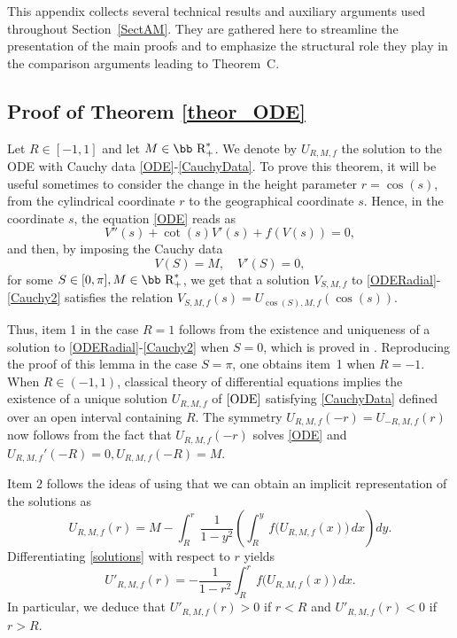 \documentclass[11pt]{article}
\def\r{\hbox{\bb R}}
\numberwithin{equation} {section}
\begin{document}
This appendix collects several technical results and auxiliary arguments used throughout Section~\ref{SectAM}. They are gathered here to streamline the presentation of the main proofs and to emphasize the structural role they play in the comparison arguments leading to Theorem~C. 

\subsection{Proof of Theorem \ref{theor_ODE}}\label{Appendix_theor_ODE}

Let $R \in [-1,1]$ and let $M \in \r_+^*$. We denote by $U_{R,M,f}$ the solution to the ODE with Cauchy data \eqref{ODE}-\eqref{CauchyData}. To prove this theorem, it will be useful sometimes to consider the change in the height parameter $r= \cos (s)$, from the cylindrical coordinate $r$ to the geographical coordinate $s$. Hence, in the coordinate $s$, the equation \eqref{ODE} reads as
\begin{equation}\label{ODERadial}
	V'' (s) + \cot (s) V' (s) + f(V(s)) =0,
\end{equation}
and then, by imposing the Cauchy data 
\begin{equation}\label{Cauchy2}
	V(S)=M, \quad V' (S)=0,
\end{equation}
for some $S \in [0, \pi], M \in \r_+^*$, we get that a solution $V_{S,M,f}$ to \eqref{ODERadial}-\eqref{Cauchy2} satisfies the relation $V_{S,M,f} (s) = U_{\cos (S),M,f} (\cos (s))$.

Thus, item 1 in the case $R=1$ follows from the existence and uniqueness of a solution to \eqref{ODERadial}-\eqref{Cauchy2} when $S=0$, which is proved in \cite[Lemma 3.5]{EM}. Reproducing the proof of this lemma in the case $S= \pi$, one obtains item~1 when $R=-1$.  When $R \in (-1,1)$, classical theory of differential equations implies the existence of a unique solution $U_{R,M,f}$ of $\eqref{ODE}$ satisfying \eqref{CauchyData} defined over an open interval containing $R$. The symmetry $U_{R,M,f} (-r) = U_{-R,M,f} (r)$ now follows from the fact that $U_{R,M,f} (-r)$ solves \eqref{ODE} and $U_{R,M,f}' (-R)=0, U_{R,M,f} (-R)=M$.

Item $2$ follows the ideas of \cite[Lemma 3.6]{EM} using that we can obtain an implicit representation of the solutions as
\begin{equation}\label{solutions}
U_{R,M,f}(r)
= M-\int_{R}^{r}\frac{1}{1-y^2}\left(\int_{R}^{y} f\bigl(U_{R,M,f}(x)\bigr)\,dx\right)dy.
\end{equation}
Differentiating \eqref{solutions} with respect to $r$ yields
\begin{equation*}
U'_{R,M,f}(r)
= -\frac{1}{1-r^2}\int_{R}^{r} f\bigl(U_{R,M,f}(x)\bigr)\,dx.
\end{equation*}
In particular, we deduce that $U'_{R,M,f} (r)>0$ if $r<R$ and $U'_{R,M,f} (r)<0$ if $r>R$. 
\end{document}
